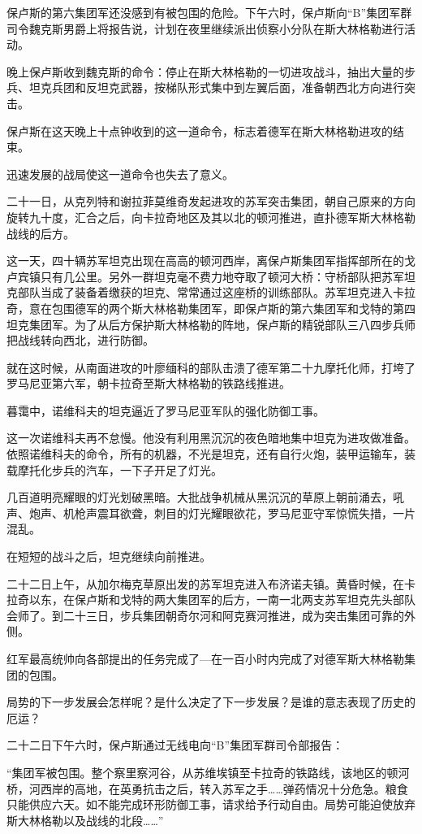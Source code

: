 保卢斯的第六集团军还没感到有被包围的危险。下午六时，保卢斯向“B”集团军群司令魏克斯男爵上将报告说，计划在夜里继续派出侦察小分队在斯大林格勒进行活动。

晚上保卢斯收到魏克斯的命令：停止在斯大林格勒的一切进攻战斗，抽出大量的步兵、坦克兵团和反坦克武器，按梯队形式集中到左翼后面，准备朝西北方向进行突击。

保卢斯在这天晚上十点钟收到的这一道命令，标志着德军在斯大林格勒进攻的结束。

迅速发展的战局使这一道命令也失去了意义。

二十一日，从克列特和谢拉菲莫维奇发起进攻的苏军突击集团，朝自己原来的方向旋转九十度，汇合之后，向卡拉奇地区及其以北的顿河推进，直扑德军斯大林格勒战线的后方。

这一天，四十辆苏军坦克出现在高高的顿河西岸，离保卢斯集团军指挥部所在的戈卢宾镇只有几公里。另外一群坦克毫不费力地夺取了顿河大桥：守桥部队把苏军坦克部队当成了装备着缴获的坦克、常常通过这座桥的训练部队。苏军坦克进入卡拉奇，意在包围德军的两个斯大林格勒集团军，即保卢斯的第六集团军和戈特的第四坦克集团军。为了从后方保护斯大林格勒的阵地，保卢斯的精锐部队三八四步兵师把战线转向西北，进行防御。

就在这时候，从南面进攻的叶廖缅科的部队击溃了德军第二十九摩托化师，打垮了罗马尼亚第六军，朝卡拉奇至斯大林格勒的铁路线推进。

暮霭中，诺维科夫的坦克逼近了罗马尼亚军队的强化防御工事。

这一次诺维科夫再不怠慢。他没有利用黑沉沉的夜色暗地集中坦克为进攻做准备。依照诺维科夫的命令，所有的机器，不光是坦克，还有自行火炮，装甲运输车，装载摩托化步兵的汽车，一下子开足了灯光。

几百道明亮耀眼的灯光划破黑暗。大批战争机械从黑沉沉的草原上朝前涌去，吼声、炮声、机枪声震耳欲聋，刺目的灯光耀眼欲花，罗马尼亚守军惊慌失措，一片混乱。

在短短的战斗之后，坦克继续向前推进。

二十二日上午，从加尔梅克草原出发的苏军坦克进入布济诺夫镇。黄昏时候，在卡拉奇以东，在保卢斯和戈特的两大集团军的后方，一南一北两支苏军坦克先头部队会师了。到二十三日，步兵集团朝奇尔河和阿克赛河推进，成为突击集团可靠的外侧。

红军最高统帅向各部提出的任务完成了—在一百小时内完成了对德军斯大林格勒集团的包围。

局势的下一步发展会怎样呢？是什么决定了下一步发展？是谁的意志表现了历史的厄运？

二十二日下午六时，保卢斯通过无线电向“B”集团军群司令部报告：

“集团军被包围。整个察里察河谷，从苏维埃镇至卡拉奇的铁路线，该地区的顿河桥，河西岸的高地，在英勇抗击之后，转入苏军之手……弹药情况十分危急。粮食只能供应六天。如不能完成环形防御工事，请求给予行动自由。局势可能迫使放弃斯大林格勒以及战线的北段……”

